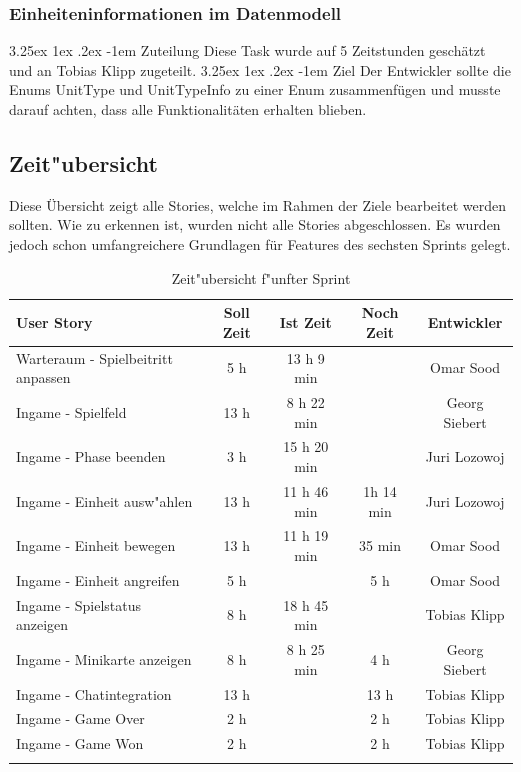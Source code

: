 \documentclass[12pt, titlepage]{scrartcl}
\makeatletter
\renewcommand\paragraph{\@startsection{paragraph}{5}{\z@}%
  {3.25ex \@plus1ex \@minus.2ex}%
  {-1em}%
  {\normalfont\normalsize\bfseries}}
\makeatother
\begin{document}
            \subsubsection{Einheiteninformationen im Datenmodell} \label{task_unit_properties}
            	\paragraph{Zuteilung}
            		Diese Task wurde auf 5 Zeitstunden gesch\"atzt und an Tobias Klipp zugeteilt.
            	\paragraph{Ziel}
            		Der Entwickler sollte die Enums UnitType und UnitTypeInfo zu einer Enum zusammenf\"ugen und musste darauf achten, dass alle Funktionalit\"aten erhalten blieben.
    \newpage
        \subsection{Zeit"ubersicht}
        	Diese \"Ubersicht zeigt alle Stories, welche im Rahmen der Ziele bearbeitet werden sollten. Wie zu erkennen ist, wurden nicht alle Stories abgeschlossen. Es wurden jedoch schon umfangreichere Grundlagen f\"ur Features des sechsten Sprints gelegt.
        	\begin{longtable}[H]{p{6cm} c c c c }
        			\label{Time_1}
       				\textbf{User Story} & \textbf{Soll Zeit} & \textbf{Ist Zeit} & \textbf{Noch Zeit} & \textbf{Entwickler} \\
       				\toprule
       				\endhead
       				Warteraum - Spielbeitritt anpassen & 5 h & 13 h 9 min &  & Omar Sood\\
       				Ingame - Spielfeld & 13 h & 8 h 22 min &  & Georg Siebert\\
       				Ingame - Phase beenden & 3 h & 15 h 20 min &  & Juri Lozowoj \\
       				Ingame - Einheit ausw"ahlen & 13 h & 11 h 46 min & 1h 14 min & Juri Lozowoj \\
       				Ingame - Einheit bewegen & 13 h & 11 h 19 min & 35 min & Omar Sood \\
       				Ingame - Einheit angreifen & 5 h &  & 5 h & Omar Sood \\
       				Ingame - Spielstatus anzeigen & 8 h & 18 h 45 min &  & Tobias Klipp \\
       				Ingame - Minikarte anzeigen & 8 h & 8 h 25 min & 4 h & Georg Siebert \\
       				Ingame - Chatintegration & 13 h &  & 13 h & Tobias Klipp \\
       				Ingame - Game Over & 2 h &  & 2 h & Tobias Klipp \\
       				Ingame - Game Won & 2 h &  & 2 h & Tobias Klipp \\
        			\caption{Zeit"ubersicht f"unfter Sprint}
        	\end{longtable}
\end{document}
